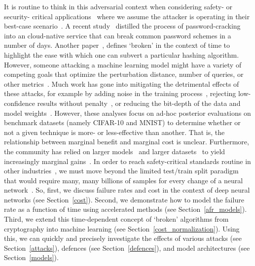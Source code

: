 It is routine to think in this adversarial context when considering safety- or security- critical applications~\cite{ai_medical_imaging,ai_security,ai_prison,ai_aviation,ai_luggage} where we assume the attacker is operating in their best-case scenario~\cite{leurent2020sha,kamal2017study,madry2017towards,pixelattack,deepfool,croce_reliable_2020}. A recent study~\cite{kamal2017study} distilled the process of password-cracking into an cloud-native service that can break common password schemes in a number of days. Another paper~\cite{leurent2020sha}, defines `broken' in the context of time to highlight the ease with which one can subvert a particular hashing algorithm. However, someone attacking a machine learning model might have a variety of competing goals that optimize the perturbation distance, number of queries, or other metrics~\cite{madry2017towards,hopskipjump,pixelattack,fgm,deepfool}. Much work has gone into mitigating the detrimental effects of these attacks, for example by adding noise in the training process~\cite{gauss_aug,gauss_out}, rejecting low-confidence results without penalty~\cite{high_conf}, or reducing the bit-depth of the data and model weights~\cite{feature_squeezing}. However, these analyses focus on ad-hoc posterior evaluations on benchmark datasets (namely CIFAR-10 and MNIST) to determine whether or not a given technique is more- or less-effective than another. That is, the relationship between marginal benefit and marginal cost is unclear. Furthermore, the community has relied on larger models~\cite{desislavov2021compute} and larger datasets~\cite{desislavov2021compute,bailly2022effects} to yield increasingly marginal gains~\cite{sun2017revisiting}. In order to reach safety-critical standards routine in other industries~\cite{iso26262,IEC61508,IEC62034}, we must move beyond the limited test/train split paradigm that would require many, many billions of samples for every change of a neural network~\cite{meyers}. So, first, we discuss failure rates and cost in the context of deep neural networks (see Section~\ref{cost}). Second, we demonstrate how to model the failure rate as a function of time  using accelerated methods (see Section~\ref{afr_models}). Third, we extend this time-dependent concept of `broken' algorithms from cryptography into machine learning (see Section~\ref{cost_normalization}). Using this, we can quickly and precisely investigate the effects of various attacks (see Section~\ref{attacks}), defences (see Section~\ref{defences}), and model architectures (see Section~\ref{models}).


